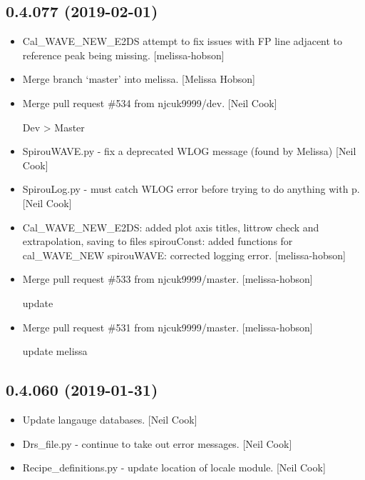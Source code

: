 \documentclass[a4paper,10pt,english]{report}
\begin{document}
\subsection{0.4.077 (2019-02-01)}
\label{\detokenize{misc/changelog:id198}}\begin{itemize}
\item {} 
Cal\_WAVE\_NEW\_E2DS attempt to fix issues with FP line adjacent to
reference peak being missing. {[}melissa-hobson{]}

\item {} 
Merge branch ‘master’ into melissa. {[}Melissa Hobson{]}

\item {} 
Merge pull request \#534 from njcuk9999/dev. {[}Neil Cook{]}

Dev \textendash{}\textgreater{} Master

\item {} 
SpirouWAVE.py - fix a deprecated WLOG message (found by Melissa) {[}Neil
Cook{]}

\item {} 
SpirouLog.py - must catch WLOG error before trying to do anything with
p. {[}Neil Cook{]}

\item {} 
Cal\_WAVE\_NEW\_E2DS: added plot axis titles, littrow check and
extrapolation, saving to files spirouConst: added functions for
cal\_WAVE\_NEW spirouWAVE: corrected logging error. {[}melissa-hobson{]}

\item {} 
Merge pull request \#533 from njcuk9999/master. {[}melissa-hobson{]}

update

\item {} 
Merge pull request \#531 from njcuk9999/master. {[}melissa-hobson{]}

update melissa

\end{itemize}


\subsection{0.4.060 (2019-01-31)}
\label{\detokenize{misc/changelog:id199}}\begin{itemize}
\item {} 
Update langauge databases. {[}Neil Cook{]}

\item {} 
Drs\_file.py - continue to take out error messages. {[}Neil Cook{]}

\item {} 
Recipe\_definitions.py - update location of locale module. {[}Neil Cook{]}

\end{itemize}
\end{document}
